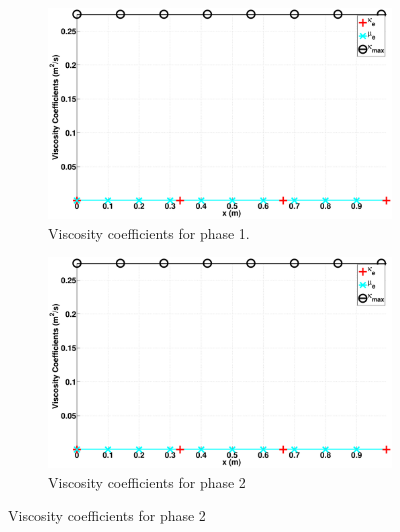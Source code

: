 \documentclass[preprint,10pt]{elsarticle}
\begin{document}
\begin{figure}[H]
        \centering
        \begin{subfigure}[b]{0.495\textwidth}
                \centering
                \includegraphics[width=\textwidth]{figures/liquid_viscosity.eps}
                \caption{Viscosity coefficients for phase 1.}
                \label{fig:adv-vf-1}
        \end{subfigure}%
        \begin{subfigure}[b]{0.495\textwidth}
                \centering
                \includegraphics[width=\textwidth]{figures/liquid_viscosity.eps}
                \caption{Viscosity coefficients for phase 2}
                \label{fig:adv-vf-2}
        \end{subfigure}
        

\end{figure}
\end{document}
